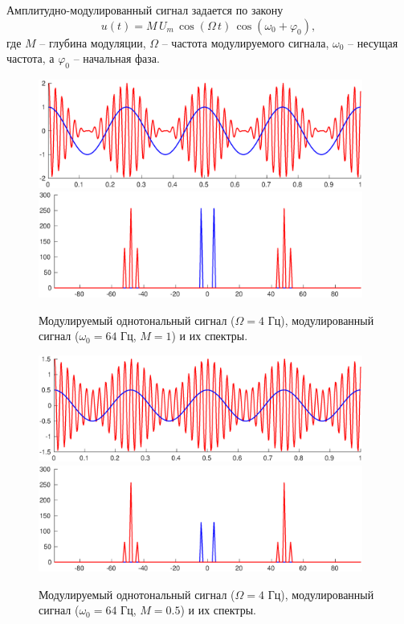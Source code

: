 \documentclass[a4paper,14pt]{extarticle}
\begin{document}
Амплитудно-модулированный сигнал задается по закону
\begin{equation*}
u(t) = M \, U_m \, \cos(\Omega\,t) \, \cos(\omega_0 + \varphi_0),
\end{equation*}
где $M$ -- глубина модуляции, $\Omega$ -- частота модулируемого сигнала, $\omega_0$ -- несущая частота, а $\varphi_0$ -- начальная фаза. 

\begin{figure}[H]
\centering
\includegraphics[width=0.95\textwidth]{ammod_m1.eps}
\includegraphics[width=0.95\textwidth]{ammod_s_m1.eps}
\captionsetup{justification=centering,margin=0.0cm}
\caption{Модулируемый однотональный сигнал ($\Omega = 4$ Гц), модулированный сигнал ($\omega_0 = 64$ Гц, $M = 1$) и их спектры.}
\label{sig}
\end{figure}

\begin{figure}[H]
\centering
\includegraphics[width=0.95\textwidth]{ammod_m05.eps}
\includegraphics[width=0.95\textwidth]{ammod_s_m05.eps}
\captionsetup{justification=centering,margin=0cm}
\caption{Модулируемый однотональный сигнал ($\Omega = 4$ Гц), модулированный сигнал ($\omega_0 = 64$ Гц, $M = 0.5$) и их спектры.}
\label{sig}
\end{figure}
\end{document}
